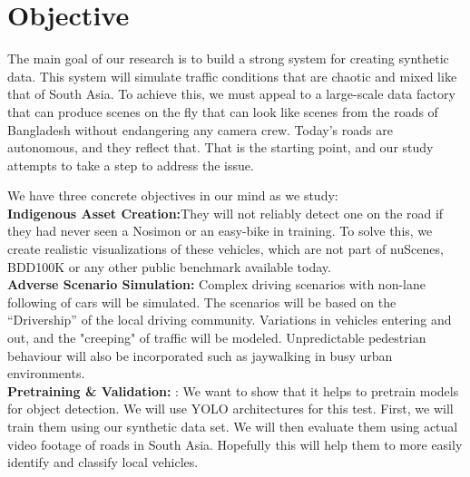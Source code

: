 \section{Objective}

The main goal of our research is to build a strong system for creating synthetic data. This system will simulate traffic conditions that are chaotic and mixed like that of South Asia. To achieve this, we must appeal to a large-scale data factory that can produce scenes on the fly that can look like scenes from the roads of Bangladesh without endangering any camera crew. Today's roads are autonomous, and they reflect that. That is the starting point, and our study attempts to take a step to address the issue.

We have three concrete objectives in our mind as we study: 
\\

\textbf{Indigenous Asset Creation:}They will not reliably detect one on the road if they had never seen a Nosimon or an easy-bike in training. To solve this, we create realistic visualizations of these vehicles, which are not part of nuScenes, BDD100K or any other public benchmark available today.\\

\textbf{Adverse Scenario Simulation:} Complex driving scenarios with non-lane following of cars will be simulated. The scenarios will be based on the “Drivership” of the local driving community. Variations in vehicles entering and out, and the "creeping" of traffic will be modeled. Unpredictable pedestrian behaviour will also be incorporated such as jaywalking in busy urban environments.\\

\textbf{Pretraining \& Validation:} : We want to show that it helps to pretrain models for object detection. We will use YOLO architectures for this test. First, we will train them using our synthetic data set. We will then evaluate them using actual video footage of roads in South Asia. Hopefully this will help them to more easily identify and classify local vehicles.\\

